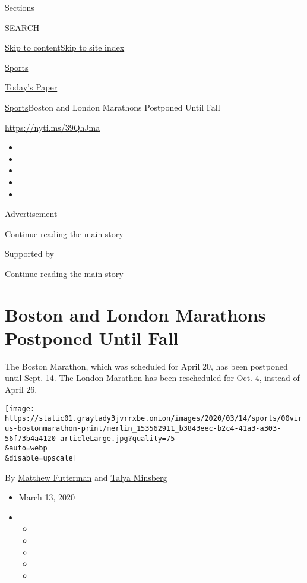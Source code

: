 Sections

SEARCH

\protect\hyperlink{site-content}{Skip to
content}\protect\hyperlink{site-index}{Skip to site index}

\href{https://www.nytimes3xbfgragh.onion/section/sports}{Sports}

\href{https://myaccount.nytimes3xbfgragh.onion/auth/login?response_type=cookie\&client_id=vi}{}

\href{https://www.nytimes3xbfgragh.onion/section/todayspaper}{Today's
Paper}

\href{/section/sports}{Sports}\textbar{}Boston and London Marathons
Postponed Until Fall

\url{https://nyti.ms/39QhJma}

\begin{itemize}
\item
\item
\item
\item
\item
\end{itemize}

Advertisement

\protect\hyperlink{after-top}{Continue reading the main story}

Supported by

\protect\hyperlink{after-sponsor}{Continue reading the main story}

\hypertarget{boston-and-london-marathons-postponed-until-fall}{%
\section{Boston and London Marathons Postponed Until
Fall}\label{boston-and-london-marathons-postponed-until-fall}}

The Boston Marathon, which was scheduled for April 20, has been
postponed until Sept. 14. The London Marathon has been rescheduled for
Oct. 4, instead of April 26.

\texttt{[image: https://static01.graylady3jvrrxbe.onion/images/2020/03/14/sports/00virus-bostonmarathon-print/merlin\_153562911\_b3843eec-b2c4-41a3-a303-56f73b4a4120-articleLarge.jpg?quality=75\\\&auto=webp\\\&disable=upscale]}

By
\href{https://www.nytimes3xbfgragh.onion/by/matthew-futterman}{Matthew
Futterman} and
\href{https://www.nytimes3xbfgragh.onion/by/talya-minsberg}{Talya
Minsberg}

\begin{itemize}
\item
  March 13, 2020
\item
  \begin{itemize}
  \item
  \item
  \item
  \item
  \item
  \end{itemize}
\end{itemize}

